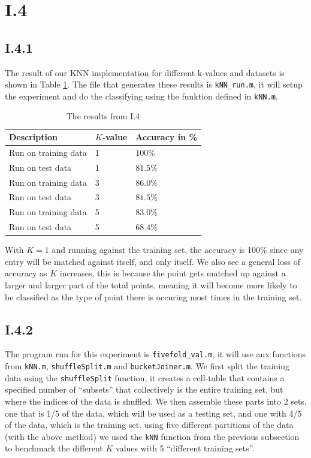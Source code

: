 \pagebreak
\section{I.4}
\subsection{I.4.1}
The result of our KNN implementation for different k-values and datasets is
shown in Table \ref{tab:knn-res}. The file that generates these results is
\texttt{kNN\_run.m}, it will setup the experiment and do the classifying using
the funktion defined in \texttt{kNN.m}.
\begin{table}
\center
\begin{tabular}{|l|l|l|}
\hline
Description          & $K$-value & Accuracy in \% \\\hline
Run on training data & 1         & $100  \%$ \\
Run on test data     & 1         & $81.5 \%$ \\
Run on training data & 3         & $86.0 \%$ \\
Run on test data     & 3         & $81.5 \%$ \\
Run on training data & 5         & $83.0 \%$ \\
Run on test data     & 5         & $68.4 \%$ \\\hline
\end{tabular}
\caption{The results from I.4}
\label{tab:knn-res}
\end{table}

With $K=1$ and running against the training set, the accuracy is 100\% since any
entry will be matched against itself, and only itself. We also see a general
loss of accuracy as $K$ increases, this is because the point gets matched up
against a larger and larger part of the total points, meaning it will become
more likely to be classified as the type of point there is occuring most times
in the training set.


\subsection{I.4.2}
The program run for this experiment is \texttt{fivefold\_val.m}, it will use aux
functions from \texttt{kNN.m}, \texttt{shuffleSplit.m} and
\texttt{bucketJoiner.m}. We first split the training data using the
\texttt{shuffleSplit} function, it creates a cell-table that contains a
specified number of ``subsets'' that collectively is the entire training set,
but where the indices of the data is shuffled. We then assemble these parts into
2 sets, one that is 1/5 of the data, which will be used as a testing set, and
one with 4/5 of the data, which is the training set.  using five different
partitions of the data (with the above method) we used the \texttt{kNN} function
from the previous subsection to benchmark the different $K$ values with 5
``different training sets''.

